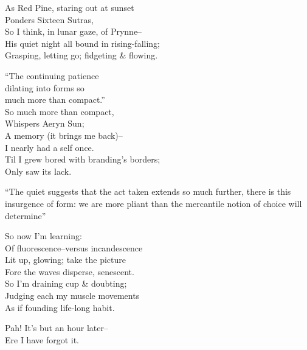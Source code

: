 As Red Pine, staring out at sunset \\
Ponders Sixteen Sutras, \\
So I think, in lunar gaze, of Prynne-- \\
His quiet night all bound in rising-falling; \\
Grasping, letting go; fidgeting \& flowing.

``The continuing patience \\
dilating into forms so \\
much more than compact.'' \\

So much more than compact, \\
Whispers Aeryn Sun; \\
A memory (it brings me back)-- \\
I nearly had a self once. \\
Til I grew bored with branding's borders; \\
Only saw its lack.

``The quiet
suggests that the act taken
extends so much further, there
is this insurgence of form:
we are more pliant than the mercantile notion 
of choice will determine''

So now I'm learning: \\
Of fluorescence--versus incandescence \\
Lit up, glowing; take the picture \\
Fore the waves disperse, senescent. \\
So I'm draining cup \& doubting; \\
Judging each my muscle movements \\
As if founding life-long habit.

\secdiv

Pah! It's but an hour later-- \\
Ere I have forgot it.